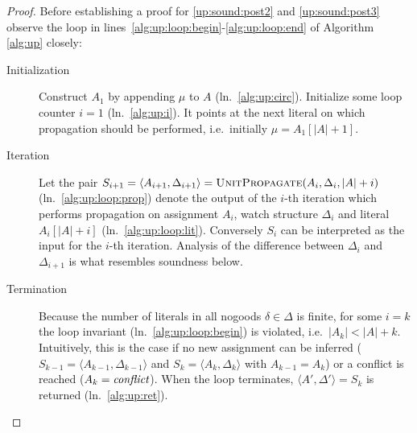 \documentclass{vutinfth} %
\newcommand{\ass}{A}
\newcommand{\dpm}{\Delta^\pm}
\newcommand{\sgl}{\mu}
\begin{document}
\begin{proof}



Before establishing a proof for \ref{up:sound:post2} and \ref{up:sound:post3} observe the loop in lines~\ref{alg:up:loop:begin}-\ref{alg:up:loop:end} of Algorithm \ref{alg:up} closely:

\begin{description}
\item[Initialization] Construct $A_1$ by appending $\sgl$ to $\ass$ (ln.~\ref{alg:up:circ}). Initialize some loop counter $i = 1$ (ln.~\ref{alg:up:i}). It points at the next literal on which propagation should be performed, i.e.~initially $\sgl = \ass_1[|\ass| + 1]$. 

\item[Iteration] Let the pair $S_{i+1} = \langle \ass_{i+1}, \Delta_{i+1} \rangle = \textsc{UnitPropagate}(\ass_i, \Delta_i, |A| + i)$ (ln.~\ref{alg:up:loop:prop}) denote the output of the $i$-th iteration which performs propagation on assignment $\ass_i$, watch structure $\Delta_i$ and literal $\ass_i[|A| + i]$ (ln.~\ref{alg:up:loop:lit}). Conversely $S_i$ can be interpreted as the input for the $i$-th iteration. Analysis of the difference between $\Delta_{i}$ and $\Delta_{i+1}$ is what resembles soundness below.

\item[Termination] Because the number of literals in all nogoods $\delta \in \Delta$ is finite, for some $i = k$ the loop invariant (ln.~\ref{alg:up:loop:begin}) is violated, i.e.~$|\ass_{k}| < |A| + k$. Intuitively, this is the case if no new assignment can be inferred ($S_{k-1} = \langle \ass_{k-1}, \Delta_{k-1} \rangle$ and $S_k = \langle \ass_k, \Delta_k \rangle$ with $\ass_{k-1} = \ass_k$) or a conflict is reached ($\ass_k = \emph{conflict}$). When the loop terminates, $\langle \ass', \Delta' \rangle = S_k$ is returned (ln.~\ref{alg:up:ret}).
\end{description}


\end{proof}
\end{document}
